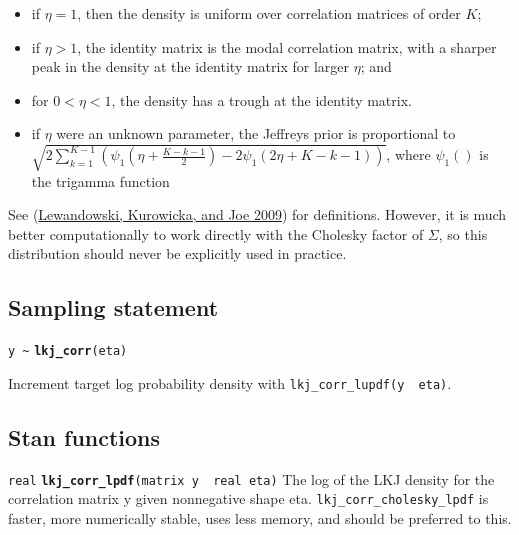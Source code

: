 \documentclass[
  10pt,
]{book}
\begin{document}
\begin{itemize}
\item
  if \(\eta = 1\), then the density is uniform over correlation
  matrices of order \(K\);
\item
  if \(\eta > 1\), the identity matrix is the modal correlation
  matrix, with a sharper peak in the density at the identity matrix
  for larger \(\eta\); and
\item
  for \(0 < \eta < 1\), the density has a trough at the identity
  matrix.
\item
  if \(\eta\) were an unknown parameter, the Jeffreys prior is
  proportional to \(\sqrt{2\sum_{k=1}^{K-1}\left( \psi_1\left(\eta+\frac{K-k-1}{2}\right) - 2\psi_1\left(2\eta+K-k-1 \right)\right)}\), where \(\psi_1()\) is the trigamma function
\end{itemize}

See (\protect\hyperlink{ref-LewandowskiKurowickaJoe:2009}{Lewandowski, Kurowicka, and Joe 2009}) for definitions. However, it is
much better computationally to work directly with the Cholesky factor
of \(\Sigma\), so this distribution should never be explicitly used in
practice.

\hypertarget{sampling-statement-57}{%
\subsection{Sampling statement}\label{sampling-statement-57}}

\texttt{y\ \textasciitilde{}} \textbf{\texttt{lkj\_corr}}\texttt{(eta)}

Increment target log probability density with \texttt{lkj\_corr\_lupdf(y\ \textbar{}\ eta)}.

\hypertarget{stan-functions-56}{%
\subsection{Stan functions}\label{stan-functions-56}}


\texttt{real} \textbf{\texttt{lkj\_corr\_lpdf}}\texttt{(matrix\ y\ \textbar{}\ real\ eta)}\newline
The log of the LKJ density for the correlation matrix y given
nonnegative shape eta. \texttt{lkj\_corr\_cholesky\_lpdf} is faster, more numerically
stable, uses less memory, and should be preferred to this.
\end{document}
